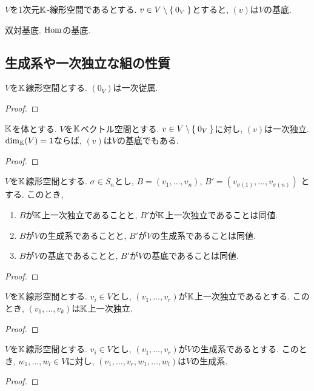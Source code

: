 \begin{example}
  $V$を1次元$\mathbb{K}$-線形空間であるとする.
  $v\in V\setminus \Set{0_V}$とすると,
  $(v)$は$V$の基底.
\end{example}

\begin{example}
双対基底.  $\operatorname{Hom}$の基底.
\end{example}

\subsection{生成系や一次独立な組の性質}
\begin{prop}
  $V$を$\mathbb{K}$線形空間とする.
  $(0_V)$は一次従属.
\end{prop}
\begin{proof}\end{proof}

\begin{prop}
  $\mathbb{K}$を体とする.
  $V$を$\mathbb{K}$ベクトル空間とする.
  $v\in V\setminus\Set{0_V}$に対し,
  $(v)$は一次独立.
  $\dim_{\mathbb{K}}(V)=1$ならば, $(v)$は$V$の基底でもある.
\end{prop}
\begin{proof}\end{proof}

\begin{prop}
  $V$を$\mathbb{K}$線形空間とする.
  $\sigma\in S_n$とし,
  $B=(v_1,\ldots,v_n)$,
  $B'=(v_{\sigma(1)},\ldots,v_{\sigma(n)})$
  とする.
  このとき,
  \begin{enumerate}
  \item $B$が$\mathbb{K}$上一次独立であることと, $B'$が$\mathbb{K}$上一次独立であることは同値.
  \item $B$が$V$の生成系であることと,  $B'$が$V$の生成系であることは同値.
  \item $B$が$V$の基底であることと,  $B'$が$V$の基底であることは同値.  
  \end{enumerate}
\end{prop}
\begin{proof}\end{proof}

\begin{prop}
  $V$を$\mathbb{K}$線形空間とする.
  $v_i\in V$とし,
  $(v_1,\ldots, v_r)$が$\mathbb{K}$上一次独立であるとする.
  このとき,
  $(v_{1},\ldots, v_{k})$は$\mathbb{K}$上一次独立.
\end{prop}
\begin{proof}\end{proof}
\begin{prop}
  $V$を$\mathbb{K}$線形空間とする.
  $v_i\in V$とし,
  $(v_1,\ldots, v_r)$が$V$の生成系であるとする.
  このとき,
  $w_1,\ldots,w_l\in V$に対し,
  $(v_{1},\ldots, v_{r},w_1,\ldots,w_l)$は$V$の生成系.
\end{prop}
\begin{proof}\end{proof}

